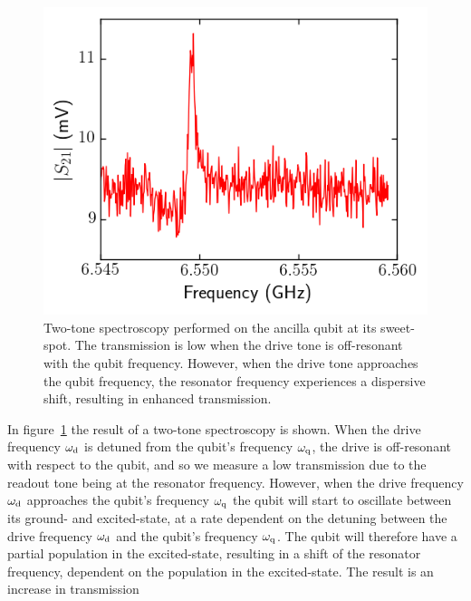        \begin{figure}
          \begin{center}
          \vspace{-30pt}
            \includegraphics[width=\textwidth]{../Figures/Qubit characterization/Spectroscopy.png}
          \end{center}
          \vspace{-20 pt}
          \caption{Two-tone spectroscopy performed on the ancilla qubit at its sweet-spot. The transmission is low when the drive tone is off-resonant with the qubit frequency. However, when the drive tone approaches the qubit frequency, the resonator frequency experiences a dispersive shift, resulting in enhanced transmission.}
          \label{fig:qubit spectroscopy}
        \end{figure}

        In figure~\ref{fig:qubit spectroscopy} the result of a two-tone spectroscopy is shown. When the drive frequency $\omega_\text{d}$ is detuned from the qubit's frequency $\omega_\text{q}$, the drive is off-resonant with respect to the qubit, and so we measure a low transmission due to the readout tone being at the resonator frequency. However, when the drive frequency $\omega_\text{d}$ approaches the qubit's frequency $\omega_\text{q}$ the qubit will start to oscillate between its ground- and excited-state, at a rate dependent on the detuning between the drive frequency $\omega_\text{d}$ and the qubit's frequency $\omega_\text{q}$. The qubit will therefore have a partial population in the excited-state, resulting in a shift of the resonator frequency, dependent on the population in the excited-state. The result is an increase in transmission

